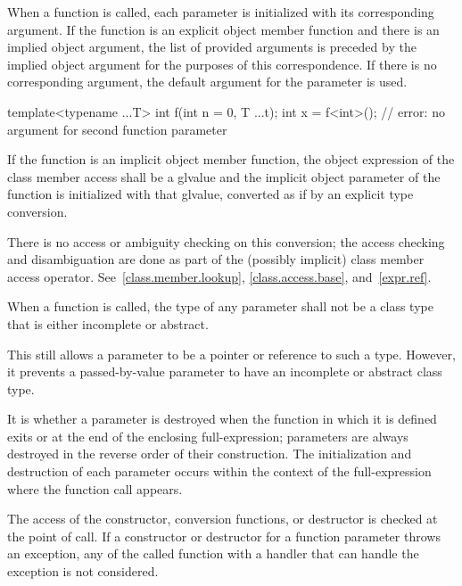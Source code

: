 \pnum
{}%
%
%
When a function is called, each parameter is
initialized with
its corresponding argument.
If the function is an explicit object member function and
there is an implied object argument,
the list of provided arguments is preceded by the implied object argument
for the purposes of this correspondence.
If there is no corresponding argument,
the default argument for the parameter is used.
\begin{example}
\begin{codeblock}
template<typename ...T> int f(int n = 0, T ...t);
int x = f<int>();               // error: no argument for second function parameter
\end{codeblock}
\end{example}
If the function is an implicit object member
function,
the object expression of the class member access shall be a glvalue and
the implicit object parameter of the function
is initialized with that glvalue,
converted as if by an explicit type conversion.
\begin{note}
There is no access or ambiguity checking on this conversion; the access
checking and disambiguation are done as part of the (possibly implicit)
class member access operator.
See~\ref{class.member.lookup}, \ref{class.access.base},
and~\ref{expr.ref}.
\end{note}
When a function is called, the type of any parameter
shall not be a class type that is either incomplete or abstract.
\begin{note}
This still allows a parameter to be a pointer or reference to such
a type. However, it prevents a passed-by-value parameter
to have an incomplete or abstract class type.
\end{note}
It is 
whether a parameter is destroyed
when the function in which it is defined exits
or at the end of the enclosing full-expression;
parameters are always destroyed in the reverse order of their construction.
The initialization and destruction of each parameter occurs
within the context of the full-expression
where the function call appears.
\begin{example}
The access of the
constructor, conversion functions, or destructor is
checked at the point of call. If a constructor
or destructor for a function parameter throws an exception,
any 
of the called function
with a handler that can handle the exception
is not considered.
\end{example}

